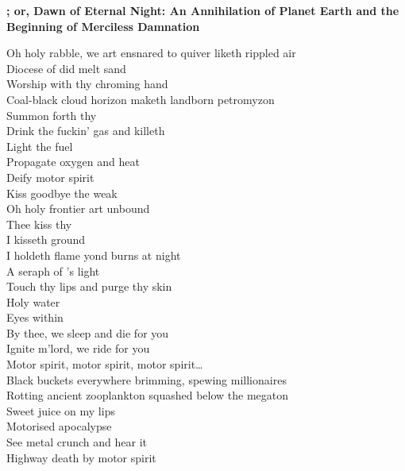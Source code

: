 \vspace*{-.5\baselineskip}
\textbf{; or, Dawn of Eternal Night: An Annihilation of Planet Earth and the Beginning of Merciless Damnation}




Oh holy rabble, we art ensnared to quiver liketh rippled air\\
Diocese of did melt sand\\
Worship with thy chroming hand\\
Coal-black cloud horizon maketh landborn petromyzon\\
Summon forth thy \\
Drink the fuckin' gas and killeth\\

Light the fuel\\
Propagate oxygen and heat\\
Deify motor spirit\\
Kiss goodbye the weak\\

Oh holy frontier art unbound\\
Thee kiss thy \\
I kisseth ground\\
I holdeth flame yond burns at night\\
A seraph of 's light\\
Touch thy lips and purge thy skin\\
Holy water\\
Eyes within\\
By thee, we sleep and die for you\\
Ignite m'lord, we ride for you\\

Motor spirit, motor spirit, motor spirit…\\

Black buckets everywhere brimming, spewing millionaires\\
Rotting ancient zooplankton squashed below the megaton\\
Sweet juice on my lips\\
Motorised apocalypse\\
See metal crunch and hear it\\
Highway death by motor spirit\\

